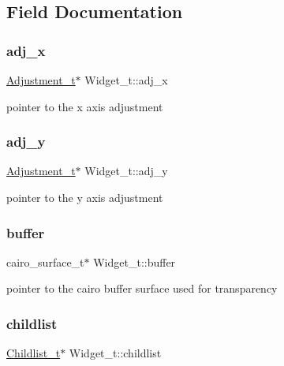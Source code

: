 \subsection{Field Documentation}
\mbox{\label{structWidget__t_aabc05e0a46c85d24483fae36127b45dd}} 
\subsubsection{\texorpdfstring{adj\+\_\+x}{adj\_x}}
{\footnotesize\ttfamily \hyperlink{structAdjustment__t}{Adjustment\+\_\+t}$\ast$ Widget\+\_\+t\+::adj\+\_\+x}

pointer to the x axis adjustment \mbox{\label{structWidget__t_abde95d3fb49faff5dd852f16810115e7}} 
\subsubsection{\texorpdfstring{adj\+\_\+y}{adj\_y}}
{\footnotesize\ttfamily \hyperlink{structAdjustment__t}{Adjustment\+\_\+t}$\ast$ Widget\+\_\+t\+::adj\+\_\+y}

pointer to the y axis adjustment \mbox{\label{structWidget__t_a84d225e7b261d67daa764b47c8c62107}} 
\subsubsection{\texorpdfstring{buffer}{buffer}}
{\footnotesize\ttfamily cairo\+\_\+surface\+\_\+t$\ast$ Widget\+\_\+t\+::buffer}

pointer to the cairo buffer surface used for transparency \mbox{\label{structWidget__t_ac203ccbc58958a7c205897d4aba197e9}} 
\subsubsection{\texorpdfstring{childlist}{childlist}}
{\footnotesize\ttfamily \hyperlink{structChildlist__t}{Childlist\+\_\+t}$\ast$ Widget\+\_\+t\+::childlist}

